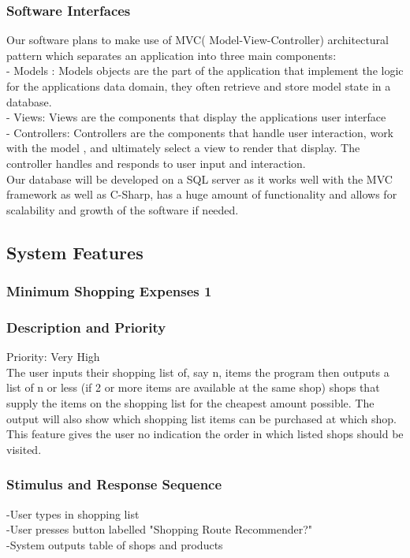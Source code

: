 \documentclass[12pt]{article}
\begin{document}
\subsubsection{Software Interfaces}
Our software plans to make use of MVC( Model-View-Controller) architectural pattern which separates an application into three main components:\\
-	Models : Models objects are the part of the application that implement the logic for the applications data domain, they often retrieve and store model state in a database.\\
-	Views: Views are the components that display the applications user interface \\
-	Controllers: Controllers are the components that handle user interaction, work with the model , and ultimately select a view to render that display. The controller handles and responds to user input and interaction.\\
   

Our database will be developed on a SQL server as it works well with the MVC framework as well as C-Sharp, has a huge amount of functionality and allows for scalability and growth of the software if needed. 

\subsection{System Features}
\subsubsection{Minimum Shopping Expenses 1}
\subsubsection*{Description and Priority}
Priority: Very High\\
 The user inputs their shopping list of, say n, items the program then outputs a list of n or less (if 2 or more items are available at the same shop) shops that supply the items on the shopping list for the cheapest amount possible. The output will also show which shopping list items can be purchased at which shop. This feature gives the user no indication the order in which listed shops should be visited.  
 \subsubsection*{Stimulus and Response Sequence}     
-User types in shopping list\\
-User presses button labelled "Shopping Route Recommender?"\\
-System outputs table of shops and products\\
\end{document}
